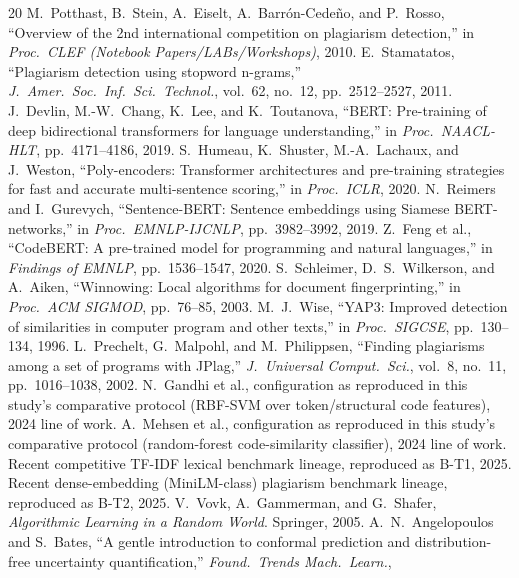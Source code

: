 \documentclass[conference]{IEEEtran}
\begin{document}
\begin{thebibliography}{20}
 M.~Potthast, B.~Stein, A.~Eiselt, A.~Barr\'on-Cede\~no, and P.~Rosso,
``Overview of the 2nd international competition on plagiarism detection,'' in \emph{Proc.\ CLEF (Notebook Papers/LABs/Workshops)}, 2010.
 E.~Stamatatos, ``Plagiarism detection using stopword n-grams,''
\emph{J.\ Amer.\ Soc.\ Inf.\ Sci.\ Technol.}, vol.~62, no.~12, pp.~2512--2527, 2011.
 J.~Devlin, M.-W.~Chang, K.~Lee, and K.~Toutanova, ``BERT: Pre-training of
deep bidirectional transformers for language understanding,'' in \emph{Proc.\ NAACL-HLT}, pp.~4171--4186, 2019.
 S.~Humeau, K.~Shuster, M.-A.~Lachaux, and J.~Weston, ``Poly-encoders:
Transformer architectures and pre-training strategies for fast and accurate multi-sentence scoring,''
in \emph{Proc.\ ICLR}, 2020.
 N.~Reimers and I.~Gurevych, ``Sentence-BERT: Sentence embeddings using
Siamese BERT-networks,'' in \emph{Proc.\ EMNLP-IJCNLP}, pp.~3982--3992, 2019.
 Z.~Feng et al., ``CodeBERT: A pre-trained model for programming and natural
languages,'' in \emph{Findings of EMNLP}, pp.~1536--1547, 2020.
 S.~Schleimer, D.~S.~Wilkerson, and A.~Aiken, ``Winnowing: Local algorithms
for document fingerprinting,'' in \emph{Proc.\ ACM SIGMOD}, pp.~76--85, 2003.
 M.~J.~Wise, ``YAP3: Improved detection of similarities in computer program and
other texts,'' in \emph{Proc.\ SIGCSE}, pp.~130--134, 1996.
 L.~Prechelt, G.~Malpohl, and M.~Philippsen, ``Finding plagiarisms among a
set of programs with JPlag,'' \emph{J.\ Universal Comput.\ Sci.}, vol.~8, no.~11, pp.~1016--1038, 2002.
 N.~Gandhi et al., configuration as reproduced in this study's comparative
protocol (RBF-SVM over token/structural code features), 2024 line of work.
 A.~Mehsen et al., configuration as reproduced in this study's comparative
protocol (random-forest code-similarity classifier), 2024 line of work.
 Recent competitive TF-IDF lexical benchmark lineage, reproduced as B-T1, 2025.
 Recent dense-embedding (MiniLM-class) plagiarism benchmark lineage, reproduced
as B-T2, 2025.
 V.~Vovk, A.~Gammerman, and G.~Shafer, \emph{Algorithmic Learning in a Random
World}. Springer, 2005.
 A.~N.~Angelopoulos and S.~Bates, ``A gentle introduction to conformal
prediction and distribution-free uncertainty quantification,'' \emph{Found.\ Trends Mach.\ Learn.},

\end{thebibliography}
\end{document}
